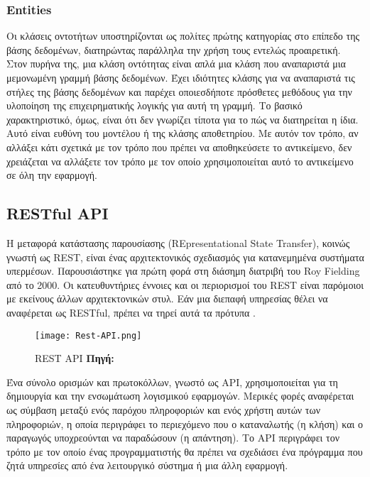 \subsubsection{Entities} \label{thb:Entities}
Οι κλάσεις οντοτήτων υποστηρίζονται ως πολίτες πρώτης κατηγορίας στο επίπεδο της βάσης δεδομένων, διατηρώντας παράλληλα την χρήση τους εντελώς προαιρετική.
Στον πυρήνα της, μια κλάση οντότητας είναι απλά μια κλάση που αναπαριστά μια μεμονωμένη γραμμή βάσης δεδομένων. Έχει ιδιότητες κλάσης για να αναπαριστά τις στήλες της βάσης δεδομένων και παρέχει οποιεσδήποτε πρόσθετες μεθόδους για την υλοποίηση της επιχειρηματικής λογικής για αυτή τη γραμμή. Το βασικό χαρακτηριστικό, όμως, είναι ότι δεν γνωρίζει τίποτα για το πώς να διατηρείται η ίδια. Αυτό είναι ευθύνη του μοντέλου ή της κλάσης αποθετηρίου. Με αυτόν τον τρόπο, αν αλλάξει κάτι σχετικά με τον τρόπο που πρέπει να αποθηκεύσετε το αντικείμενο, δεν χρειάζεται να αλλάξετε τον τρόπο με τον οποίο χρησιμοποιείται αυτό το αντικείμενο σε όλη την εφαρμογή.

\subsection{RESTful API}
Η μεταφορά κατάστασης παρουσίασης (REpresentational State Transfer), κοινώς γνωστή ως REST, είναι ένας αρχιτεκτονικός σχεδιασμός για κατανεμημένα συστήματα υπερμέσων. Παρουσιάστηκε για πρώτη φορά στη διάσημη διατριβή του Roy Fielding από το 2000.
Οι κατευθυντήριες έννοιες και οι περιορισμοί του REST είναι παρόμοιοι με εκείνους άλλων αρχιτεκτονικών στυλ. Εάν μια διεπαφή υπηρεσίας θέλει να αναφέρεται ως RESTful, πρέπει να τηρεί αυτά τα πρότυπα \cite{Gupta_2020}.

\begin{figure}[ht]
	\centering
	\texttt{[image: Rest-API.png]}
	\caption[{REST API}]{REST API \textbf{Πηγή:} \parencite{fig_Rest_API}}
	\label{fig:rest_api}
\end{figure}

Ένα σύνολο ορισμών και πρωτοκόλλων, γνωστό ως API, χρησιμοποιείται για τη δημιουργία και την ενσωμάτωση λογισμικού εφαρμογών. Μερικές φορές αναφέρεται ως σύμβαση μεταξύ ενός παρόχου πληροφοριών και ενός χρήστη αυτών των πληροφοριών, η οποία περιγράφει το περιεχόμενο που ο καταναλωτής (η κλήση) και ο παραγωγός υποχρεούνται να παραδώσουν (η απάντηση). Το API περιγράφει τον τρόπο με τον οποίο ένας προγραμματιστής θα πρέπει να σχεδιάσει ένα πρόγραμμα που ζητά υπηρεσίες από ένα λειτουργικό σύστημα ή μια άλλη εφαρμογή. 

